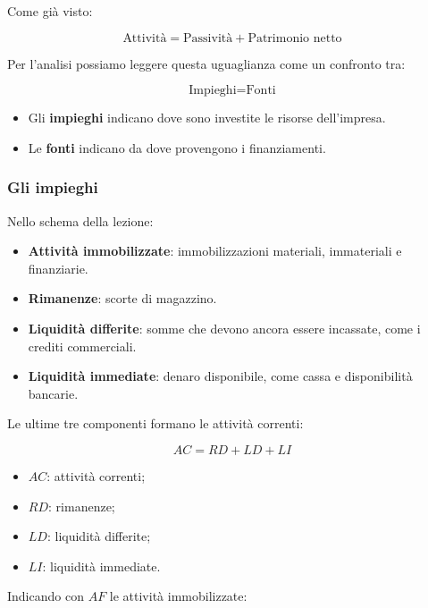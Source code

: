 \noindent Come già visto:

\[
\boxed{
\text{Attività}
=
\text{Passività}
+
\text{Patrimonio netto}
}
\]

\noindent Per l'analisi
possiamo leggere questa uguaglianza
come un confronto tra:

\[
\boxed{
\text{Impieghi}=\text{Fonti}
}
\]

\begin{itemize}
    \item Gli \textbf{impieghi}
    indicano dove sono investite
    le risorse dell'impresa.

    \item Le \textbf{fonti}
    indicano da dove provengono
    i finanziamenti.
\end{itemize}


\subsubsection*{Gli impieghi}

\noindent Nello schema della lezione:

\begin{itemize}
    \item \textbf{Attività immobilizzate}:
    immobilizzazioni materiali,
    immateriali e finanziarie.

    \item \textbf{Rimanenze}:
    scorte di magazzino.

    \item \textbf{Liquidità differite}:
    somme che devono ancora essere incassate,
    come i crediti commerciali.

    \item \textbf{Liquidità immediate}:
    denaro disponibile,
    come cassa e disponibilità bancarie.
\end{itemize}

\noindent Le ultime tre componenti
formano le attività correnti:

\[
\boxed{
AC=RD+LD+LI
}
\]

\begin{itemize}
    \item $AC$: attività correnti;
    \item $RD$: rimanenze;
    \item $LD$: liquidità differite;
    \item $LI$: liquidità immediate.
\end{itemize}

\noindent Indicando con $AF$
le attività immobilizzate:

